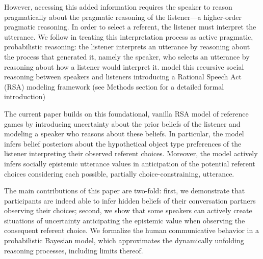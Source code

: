 \documentclass[10pt,a4paper]{article}
\begin{document}
However, accessing this added information requires the speaker to reason pragmatically about the pragmatic reasoning of the listener---a higher-order pragmatic reasoning.
In order to select a referent, the listener must interpret the utterance. We follow  in treating this interpretation process as active pragmatic, probabilistic reasoning: the listener interprets an utterance by reasoning about the process that generated it, namely the speaker, who selects an utterance by reasoning about how a listener would interpret it. \citeauthor{frankgoodman2012} model this recursive social reasoning between speakers and listeners introducing a Rational Speech Act (RSA) modeling framework (see Methods section for a detailed formal introduction)


The current paper builds on this foundational, vanilla RSA model of reference games by introducing uncertainty about the prior beliefs of the listener and modeling a speaker who reasons about these beliefs.
In particular, the model infers belief posteriors about the hypothetical object type preferences of the listener interpreting their observed referent choices.
Moreover, the model actively infers socially epistemic utterance values in anticipation of the potential referent choices considering each possible, partially choice-constraining, utterance.   

The main contributions of this paper are two-fold: first, we demonstrate that participants are indeed able to infer hidden beliefs of their conversation partners observing their choices; second, we show that some speakers can actively create situations of uncertainty anticipating the epistemic value when observing the consequent referent choice. 
We formalize the human communicative behavior in a probabilistic Bayesian model, which approximates the dynamically unfolding reasoning processes, including limits thereof. 
\end{document}

